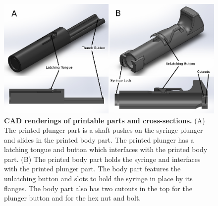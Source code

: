 \documentclass{naturegraphicx}
\begin{document}
\begin{figure}
\includegraphics[scale=0.4]{figure1.png} %
\caption{
{\bf CAD renderings of printable parts and cross-sections.} (A) The printed plunger part is a shaft pushes on the syringe plunger and slides in the printed body part. The printed plunger has a latching tongue and button which interfaces with the printed body part. (B) The printed body part holds the syringe and interfaces with the printed plunger part. The body part features the unlatching button and slots to hold the syringe in place by its flanges. The body part also has two cutouts in the top for the plunger button and for the hex nut and bolt.
}
\label{fig1}
\end{figure}
\end{document}
